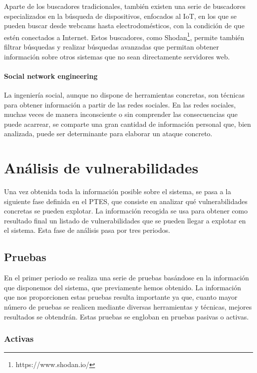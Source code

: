 Aparte de los buscadores tradicionales, también existen una serie de buscadores especializados en la búsqueda de dispositivos, enfocados al IoT, en los que se pueden buscar desde webcams hasta electrodomésticos, con la condición de que estén conectados a Internet. Estos buscadores, como Shodan\footnote{https://www.shodan.io/}, permite también filtrar búsquedas y realizar búsquedas avanzadas que permitan obtener información sobre otros sistemas que no sean directamente servidores web.

\paragraph{Social network engineering}

La ingeniería social, aunque no dispone de herramientas concretas, son técnicas para obtener información a partir de las redes sociales. En las redes sociales, muchas veces de manera inconsciente o sin comprender las consecuencias que puede acarrear, se comparte una gran cantidad de información personal que, bien analizada, puede ser determinante para elaborar un ataque concreto.

\section{Análisis de vulnerabilidades}

Una vez obtenida toda la información posible sobre el sistema, se pasa a la siguiente fase definida en el PTES, que consiste en analizar qué vulnerabilidades concretas se pueden explotar. La información recogida se usa para obtener como resultado final un listado de vulnerabilidades que se pueden llegar a explotar en el sistema. Esta fase de análisis pasa por tres periodos.

\subsection{Pruebas}

En el primer periodo se realiza una serie de pruebas basándose en la información que disponemos del sistema, que previamente hemos obtenido. La información que nos proporcionen estas pruebas resulta importante ya que, cuanto mayor número de pruebas se realicen mediante diversas herramientas y técnicas, mejores resultados se obtendrán. Estas pruebas se engloban en pruebas pasivas o activas.

\subsubsection{Activas}

